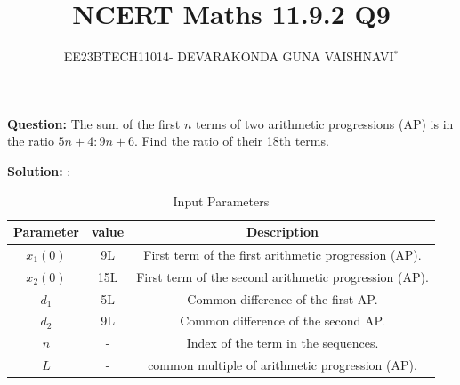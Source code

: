 \documentclass[journal,12pt,onecolumn]{IEEEtran}
\title{
	
	\title{NCERT Maths 11.9.2 Q9}
	\author{EE23BTECH11014- DEVARAKONDA GUNA VAISHNAVI$^{*}$%
	}
	
	
}
\theoremstyle{remark}
\newcommand{\solution}{\noindent \textbf{Solution: }}
\begin{document}
\maketitle
	
\textbf{Question:} 
The sum of the first $n$ terms of two arithmetic progressions (AP) is in the ratio $5n+4 : 9n+6$. Find the ratio of their 18th terms.

\solution:

\begin{table}[htbp]
	\centering
    \begin{tabular}{|c|c|c|}
    \hline
    \textbf{Parameter} &\textbf{value}& \textbf{Description} \\
    \hline
    \( x_1(0) \) & 9L& First term of the first arithmetic progression (AP). \\
    \hline
    \( x_2(0) \) & 15L& First term of the second arithmetic progression (AP).  \\
    \hline
    \( d_1 \) & 5L &Common difference of the first AP. \\
    \hline
    \( d_2 \) & 9L&Common difference of the second AP. \\
    \hline
    \( n \) & - &Index of the term in the sequences. \\
    \hline
    \( L\) & - &common multiple of  arithmetic progression (AP).\\
    \hline
    \end{tabular}
    \label{tab:parameters}
     \caption{Input Parameters}
\end{table}
\end{document}
